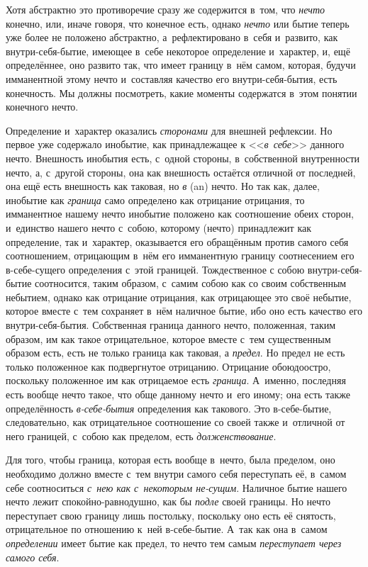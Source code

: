 \bigskip


Хотя абстрактно это противоречие сразу же содержится в~том, что
{\em нечто} конечно, или, иначе говоря, что конечное
есть, однако {\em нечто} или бытие теперь уже более не
положено абстрактно, а~рефлектировано в~себя и~развито, как
внутри-себя-бытие, имеющее в~себе некоторое определение и~характер, и, ещё
определённее, оно развито так, что имеет границу в~нём самом, которая,
будучи имманентной этому нечто и~составляя качество его внутри-себя-бытия,
есть конечность. Мы должны посмотреть, какие моменты содержатся в~этом
понятии конечного нечто.

Определение и~характер оказались {\em сторонами} для
внешней рефлексии. Но первое уже содержало инобытие, как принадлежащее к
<<{\em в~себе}>> данного нечто. Внешность инобытия есть,
с~одной стороны, в~собственной внутренности нечто, а, с~другой стороны, она
как внешность остаётся отличной от последней, она ещё есть внешность как
таковая, но {\em в} (an) нечто. Но так как, далее,
инобытие как {\em граница} само определено как
отрицание отрицания, то имманентное нашему нечто инобытие положено как
соотношение обеих сторон, и~единство нашего нечто с~собою, которому (нечто)
принадлежит как определение, так и~характер, оказывается его обращённым
против самого себя соотношением, отрицающим в~нём его имманентную границу
соотнесением его в-себе-сущего определения с~этой границей. Тождественное с
собою внутри-себя-бытие соотносится, таким образом, с~самим собою как со
своим собственным небытием, однако как отрицание отрицания, как отрицающее
это своё небытие, которое вместе с~тем сохраняет в~нём наличное бытие, ибо
оно есть качество его внутри-себя-бытия. Собственная граница данного нечто,
положенная, таким образом, им как такое отрицательное, которое вместе с~тем
существенным образом есть, есть не только граница как таковая, а
{\em предел}. Но предел не есть только положенное как
подвергнутое отрицанию. Отрицание обоюдоостро, поскольку положенное им как
отрицаемое есть {\em граница}. А~именно, последняя есть
вообще нечто такое, что обще данному нечто и~его иному; она есть также
определённость {\em в-себе-бытия} определения как
такового. Это в-себе-бытие, следовательно, как отрицательное соотношение со
своей также и~отличной от него границей, с~собою как пределом, есть
{\em долженствование}.

Для того, чтобы граница, которая есть вообще в~нечто, была пределом, оно
необходимо должно вместе с~тем внутри самого себя переступать её, в~самом
себе соотноситься {\em с~нею как с~некоторым не-сущим}.
Наличное бытие нашего нечто лежит спокойно-равнодушно, как бы
{\em подле} своей границы. Но нечто переступает свою
границу лишь постольку, поскольку оно есть её снятость, отрицательное по
отношению к~ней в-себе-бытие. А~так как она в~самом
{\em определении} имеет бытие как предел, то нечто тем
самым {\em переступает через самого себя}.

